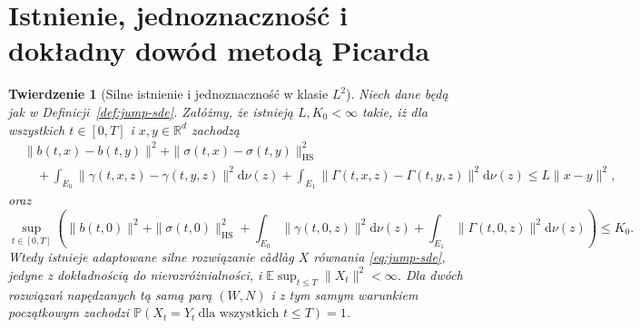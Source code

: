 \documentclass[11pt,a4paper,oneside]{report}
\numberwithin{equation}{chapter}
\theoremstyle{plain}
\newtheorem{twierdzenie}{Twierdzenie}[chapter]
\theoremstyle{definition}
\theoremstyle{remark}
\newcommand{\R}{\mathbb{R}}
\newcommand{\Prob}{\mathbb{P}}
\newcommand{\E}{\mathbb{E}}
\newcommand{\dd}{\mathrm{d}}
\begin{document}
\section{Istnienie, jednoznaczność i dokładny dowód metodą Picarda}

\begin{twierdzenie}[Silne istnienie i jednoznaczność w klasie $L^2$]
\label{th:jump-picard}
Niech dane będą jak w Definicji~\ref{def:jump-sde}.
Załóżmy, że istnieją $L,K_0<\infty$ takie, iż dla wszystkich
$t\in[0,T]$ i $x,y\in\R^d$ zachodzą
\[
\begin{split}
&\|b(t,x)-b(t,y)\|^2+
 \|\sigma(t,x)-\sigma(t,y)\|_{\mathrm{HS}}^2\\
&\quad+\int_{E_0}\|\gamma(t,x,z)-\gamma(t,y,z)\|^2\dd\nu(z)
 +\int_{E_1}\|\Gamma(t,x,z)-\Gamma(t,y,z)\|^2\dd\nu(z)
 \le L\|x-y\|^2,
\end{split}
\tag{13.3}\label{eq:jump-lip}
\]
oraz
\[
\sup_{t\in[0,T]}\left(
\|b(t,0)\|^2+\|\sigma(t,0)\|_{\mathrm{HS}}^2
+\int_{E_0}\|\gamma(t,0,z)\|^2\dd\nu(z)
+\int_{E_1}\|\Gamma(t,0,z)\|^2\dd\nu(z)
\right)\le K_0.
\tag{13.4}\label{eq:jump-at-zero}
\]
Wtedy istnieje adaptowane silne rozwiązanie càdlàg $X$
równania \eqref{eq:jump-sde}, jedyne z dokładnością
do nierozróżnialności, i
$\E\sup_{t\le T}\|X_t\|^2<\infty$.
Dla dwóch rozwiązań napędzanych tą samą parą $(W,N)$
i z tym samym warunkiem początkowym zachodzi
$\Prob(X_t=Y_t\ \text{dla wszystkich }t\le T)=1$.
\end{twierdzenie}
\end{document}
